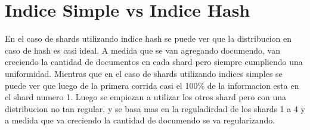 \documentclass[a4paper, 10pt, twoside]{article}
\begin{document}
\section{Indice Simple vs Indice Hash}

En el caso de shards utilizando indice hash se puede ver que la distribucion en caso de hash es casi ideal. A medida que se van agregando documendo, van creciendo la cantidad de documentos en cada shard pero siempre cumpliendo una uniformidad.
Mientras que en el caso de shards utilizando indices simples se puede ver que luego de la primera corrida casi el 100\% de la informacion esta en el shard numero 1.
Luego se empiezan a utilizar los otros shard pero con una distribucion no tan regular, y se basa mas en la reguladirdad de los shards 1 a 4 y a medida que va creciendo la cantidad de documendo se va regularizando.
\end{document}
